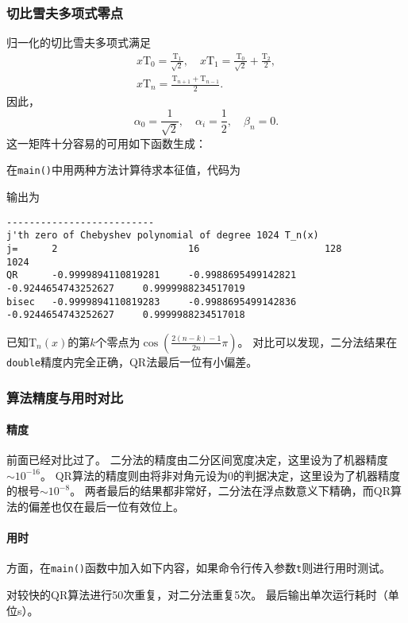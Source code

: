 \documentclass[a4paper,unicode]{report}
\begin{document}
\subsubsection{切比雪夫多项式零点}
归一化的切比雪夫多项式满足
\begin{gather}
    x\mathrm{T}_0 = \frac{\mathrm{T}_1}{\sqrt{2}},\quad x\mathrm{T}_1 = \frac{\mathrm{T}_0}{\sqrt{2}} + \frac{\mathrm{T}_2}{2},\\
    x\mathrm{T}_n = \frac{\mathrm{T}_{n+1} + \mathrm{T}_{n-1}}{2}.
\end{gather}
因此，
\begin{equation}
    \alpha_0 = \frac{1}{\sqrt{2}},\quad\alpha_i = \frac{1}{2},\quad \beta_n = 0.
\end{equation}
这一矩阵十分容易的可用如下函数生成：
{
    \linespread{1.0}
    
    
}
在\texttt{main()}中用两种方法计算待求本征值，代码为
{
    \linespread{1.0}
    
}
输出为
{
\footnotesize
\begin{verbatim}
--------------------------
j'th zero of Chebyshev polynomial of degree 1024 T_n(x)
j=      2                       16                      128                     1024
QR      -0.9999894110819281     -0.9988695499142821     -0.9244654743252627     0.9999988234517019
bisec   -0.9999894110819283     -0.9988695499142836     -0.9244654743252627     0.9999988234517018
\end{verbatim}
}
已知$\mathrm{T}_n(x)$的第$k$个零点为$\cos(\frac{2(n-k)-1}{2n}\pi)$。
对比可以发现，二分法结果在\texttt{double}精度内完全正确，QR法最后一位有小偏差。

\subsubsection{算法精度与用时对比}
\paragraph{精度}
前面已经对比过了。
二分法的精度由二分区间宽度决定，这里设为了机器精度$\sim 10^{-16}$。
QR算法的精度则由将非对角元设为0的判据决定，这里设为了机器精度的根号$\sim 10^{-8}$。
两者最后的结果都非常好，二分法在浮点数意义下精确，而QR算法的偏差也仅在最后一位有效位上。

\paragraph{用时}
方面，在\texttt{main()}函数中加入如下内容，如果命令行传入参数\texttt{t}则进行用时测试。
{
    \linespread{1.0}
    
}
对较快的QR算法进行50次重复，对二分法重复5次。
最后输出单次运行耗时（单位\textmu{}s）。
\end{document}
